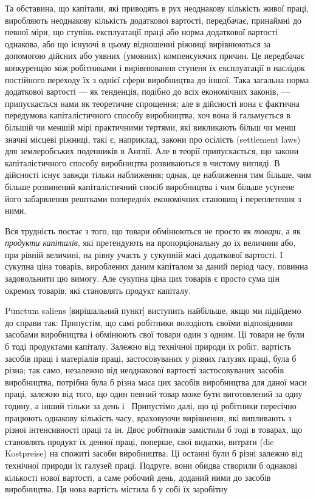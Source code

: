 Та обставина, що капітали, які приводять в рух неоднакову
кількість живої праці, виробляють неоднакову кількість додаткової
вартості, передбачає, принаймні до певної міри, що ступінь
експлуатації праці або норма додаткової вартості однакова, або
що існуючі в цьому відношенні ріжниці вирівнюються за допомогою
дійсних або уявних (умовних) компенсуючих причин.
Це передбачає конкуренцію між робітниками і вирівнювання
ступеня їх експлуатації в наслідок постійного переходу їх
з однієї сфери виробництва до іншої. Така загальна норма додаткової
вартості — як тенденція, подібно до всіх економічних
законів, — припускається нами як теоретичне спрощення; але
в дійсності вона є фактична передумова капіталістичного способу
виробництва, хоч вона й гальмується в більшій чи меншій
мірі практичними тертями, які викликають більш чи менш
значні місцеві ріжниці, такі є, наприклад, закони про осілість
(settlement laws) для землеробських поденників в Англії. Але
в теорії припускається, що закони капіталістичного способу
виробництва розвиваються в чистому вигляді. В дійсності існує
завжди тільки наближення; однак, це наближення тим більше,
чим більше розвинений капіталістичний спосіб виробництва і чим
більше усунене його забарвлення рештками попередніх економічних
становищ і переплетення з ними.

Вся трудність постає з того, що товари обмінюються не
просто як \emph{товари}, а як \emph{продукти капіталів}, які претендують
на пропорціональну до їх величини або, при рівній величині, на
рівну участь у сукупній масі додаткової вартості. І сукупна
ціна товарів, вироблених даним капіталом за даний період часу,
повинна задовольнити цю вимогу. Але сукупна ціна цих товарів
є просто сума цін окремих товарів, які становлять продукт
капіталу.

Punctum saliens [вирішальний пункт] виступить найбільше, якщо
ми підійдемо до справи так: Припустім, що самі робітники
володіють своїми відповідними засобами виробництва і обмінюють
свої товари один з одним. Ці товари не були б тоді
продуктами капіталу. Залежно від технічної природи їх робіт,
вартість засобів праці і матеріалів праці, застосовуваних у різних
галузях праці, була б різна; так само, незалежно від неоднакової
вартості застосовуваних засобів виробництва, потрібна була б
різна маса цих засобів виробництва для даної маси праці, залежно
від того, що один певний товар може бути виготовлений
за одну годину, а інший тільки за день і~ Припустімо
далі, що ці робітники пересічно працюють однакову кількість
часу, враховуючи вирівнення, які випливають з різної інтенсивності
праці та ін. Двоє робітників замістили б тоді в товарах,
що становлять продукт їх денної праці, поперше, свої
видатки, витрати (die Kostpreise) на спожиті засоби виробництва.
Ці останні були б різні залежно від технічної природи їх галузей
праці. Подруге, вони обидва створили б однакові кількості
нової вартості, а саме робочий день, доданий ними до засобів
виробництва. Ця нова вартість містила б у собі їх заробітну
\parbreak{}  %
